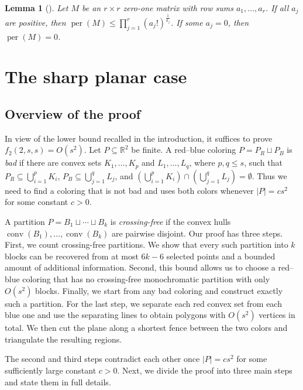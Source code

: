 \documentclass[11pt]{article}
\newtheorem{lemma}[theorem]{Lemma}
\theoremstyle{definition}
\newcommand*{\abs}[1]{\lvert#1\rvert}
\newcommand{\R}{\mathbb{R}}
\newcommand{\conv}{\operatorname{conv}}
\begin{document}
\begin{lemma}[\cite{Bregman1973}]\label{lem:bregman}
Let \(M\) be an \(r\times r\) zero-one matrix with row sums \(a_{1},\ldots,a_{r}\). If all \(a_{j}\) are positive, then \(\operatorname{per}(M)\le\prod_{j=1}^{r}(a_{j}!)^{\frac{1}{a_{j}}}\). If some \(a_{j}=0\), then \(\operatorname{per}(M)=0\).
\end{lemma}

\section{The sharp planar case}\label{sec:planar}

\subsection{Overview of the proof}

In view of the lower bound recalled in the introduction, it suffices to prove \(f_{2}(2,s,s)=O(s^{2})\). Let \(P\subseteq\R^{2}\) be finite. A red--blue coloring \(P=P_{R}\sqcup P_{B}\) is \emph{bad} if there are convex sets \(K_{1},\ldots,K_{p}\) and \(L_{1},\ldots,L_{q}\), where \(p,q\le s\), such that \(P_{R}\subseteq\bigcup_{i=1}^{p}K_{i}\), \(P_{B}\subseteq\bigcup_{j=1}^{q}L_{j}\), and \(\left(\bigcup_{i=1}^{p}K_{i}\right)\cap\left(\bigcup_{j=1}^{q}L_{j}\right)=\emptyset\). Thus we need to find a coloring that is not bad and uses both colors whenever \(\abs{P}=cs^{2}\) for some constant \(c>0\).

A partition \(P=B_{1}\sqcup\cdots\sqcup B_{k}\) is \emph{crossing-free} if the convex hulls \(\conv(B_{1}),\ldots,\conv(B_{k})\) are pairwise disjoint. Our proof has three steps. First, we count crossing-free partitions. We show that every such partition into \(k\) blocks can be recovered from at most \(6k-6\) selected points and a bounded amount of additional information. Second, this bound allows us to choose a red--blue coloring that has no crossing-free monochromatic partition with only \(O(s^{2})\) blocks. Finally, we start from any bad coloring and construct exactly such a partition. For the last step, we separate each red convex set from each blue one and use the separating lines to obtain polygons with \(O(s^{2})\) vertices in total. We then cut the plane along a shortest fence between the two colors and triangulate the resulting regions.

The second and third steps contradict each other once \(\abs{P}=cs^{2}\) for some sufficiently large constant \(c>0.\) Next, we divide the proof into three main steps and state them in full details.
\end{document}
